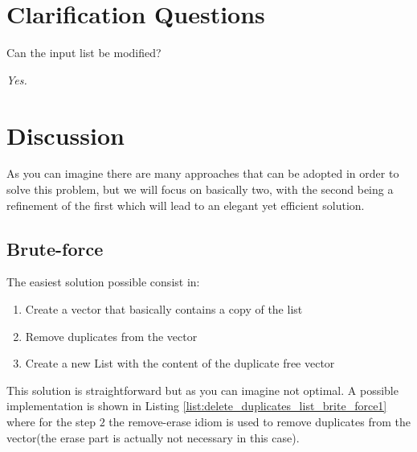\section{Clarification Questions}

\begin{QandA}
	\item \begin{questionitem} \begin{question} Can the input list be modified?  \end{question} 	 
    \begin{answered}
		\textit{Yes.}
	\end{answered} \end{questionitem}
	
\end{QandA}

\section{Discussion}
\label{delete_duplicates_list:sec:discussion}
As you can imagine there are many approaches that can be adopted in order to solve this problem, but we will focus on basically two, with the second being a refinement of the first which will lead to an elegant yet efficient solution.

\subsection{Brute-force}
\label{delete_duplicates_list:sec:bruteforce}
The easiest solution possible consist in:
\begin{enumerate}
	\item Create a vector that basically contains a copy of the list
	\item Remove duplicates from the vector
	\item Create a new List with the content of the duplicate free vector
\end{enumerate}
This solution is straightforward but as you can imagine not optimal. A possible implementation is shown in Listing \ref{list:delete_duplicates_list_brite_force1} where for the step $2$ the  remove-erase idiom\cite{cit::wiki::remove-erase} is used to remove duplicates from the vector(the erase part is actually not necessary in this case).



